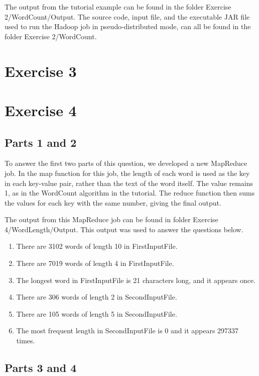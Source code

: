 \documentclass[12t]{article}
\begin{document}
	The output from the tutorial example can be found in the folder Exercise 2/WordCount/Output. The source code, input file, and the executable JAR file used to run the Hadoop job in pseudo-distributed mode, can all be found in the folder Exercise 2/WordCount. 
	
	\section*{Exercise 3}

	\section*{Exercise 4}
	\subsection*{Parts 1 and 2}
	
	To answer the first two parts of this question, we developed a new MapReduce job. In the map function for this job, the length of each word is used as the key in each key-value pair, rather than the text of the word itself. The value remains 1, as in the WordCount algorithm in the tutorial. The reduce function then sums the values for each key with the same number, giving the final output.  
	
	The output from this MapReduce job can be found in folder Exercise 4/WordLength/Output. This output was used to answer the questions below. 
	
\begin{enumerate} 
  \item There are 3102 words of length 10 in FirstInputFile.
  \item There are 7019 words of length 4 in FirstInputFile.
  \item The longest word in FirstInputFile is 21 characters long, and it appears once.
  \item There are 306 words of length 2 in SecondInputFile.
  \item There are 105 words of length 5 in SecondInputFile.
  \item The most frequent length in SecondInputFile is 0 and it appears 297337 times. 
\end{enumerate}
	
	\subsection*{Parts 3 and 4}	
	
\end{document}
